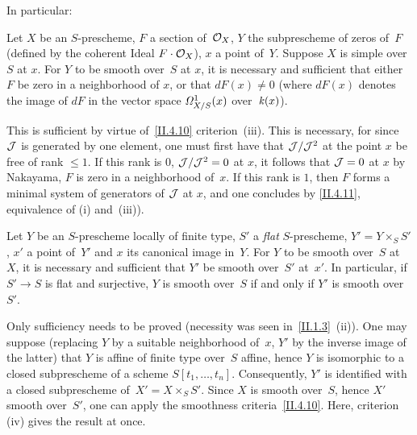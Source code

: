 In particular:

\begin{corollary}
\label{II.4.12}
Let $X$ be an $S$-prescheme, $F$ a section of~$\cal{O}_X$,
$Y$ the subprescheme of zeros of~$F$ (defined by
the coherent Ideal $F\cdot\cal{O}_X$), $x$ a point of~$Y$.
Suppose $X$ is simple over~$S$ at $x$. For $Y$ to be smooth over~$S$ at
$x$, it is necessary and sufficient that either $F$ be zero in a neighborhood of
$x$, or that $dF(x) \neq 0$ (where $dF(x)$ denotes the image of
$dF$ in the vector space $\it{\Omega}^1_{X/S}(x)$ over~$\kres(x)$).
\end{corollary}

This is sufficient by virtue of~\ref{II.4.10} criterion~(iii). This is
necessary, for since $\cal{J}$ is generated by one
element, one must first have that $\cal{J}/\cal{J}^2$ at the point $x$
be free of rank $\leq 1$. If this rank is $0$,
\ie $\cal{J}/\cal{J}^2=0$ at $x$, it follows that $\cal{J}=0$ at $x$
by Nakayama, \ie $F$ is zero in a neighborhood of~$x$. If this rank is
$1$, then $F$ forms a minimal system of generators of
$\cal{J}$ at $x$, and one concludes by \eqref{II.4.11}, equivalence of
(i) and~(iii)).

\begin{corollary}
\label{II.4.13}
Let $Y$ be an $S$-prescheme locally of finite type, $S'$ a
\emph{flat} $S$-prescheme, $Y'=Y \times_S S'$, $x'$ a point
of~$Y'$ and $x$ its canonical image in~$Y$. For $Y$ to be smooth
over~$S$ at~$X$, it is necessary and sufficient that $Y'$ be smooth over~$S'$ at~$x'$. In particular, if $S'\to S$ is flat and surjective, $Y$ is
smooth over~$S$
if and only if $Y'$ is smooth over~$S'$.
\end{corollary}

Only sufficiency needs to be proved (necessity was
seen in~\ref{II.1.3}~(ii)). One may suppose (replacing $Y$ by a suitable neighborhood of~$x$, $Y'$ by the inverse image
of the latter) that $Y$ is affine of finite type over~$S$ affine, hence
$Y$ is isomorphic to a closed subprescheme of a
scheme $S[t_1,\dots,t_n]$. Consequently, $Y'$ is identified with a
closed subprescheme of~$X'=X \times_S S'$. Since $X$ is
smooth over~$S$, hence $X'$ smooth over~$S'$, one can apply the
smoothness criteria~\ref{II.4.10}. Here, criterion (iv)
gives the result at once.
